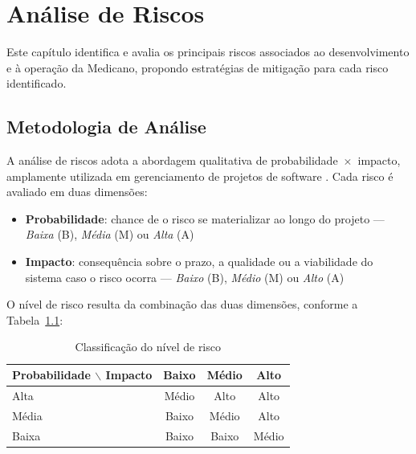 \chapter{Análise de Riscos}
\label{chap:risks}

Este capítulo identifica e avalia os principais riscos
associados ao desenvolvimento e à operação da Medicano,
propondo estratégias de mitigação para cada risco
identificado.

\section{Metodologia de Análise}
\label{sec:risk-methodology}

A análise de riscos adota a abordagem qualitativa de
probabilidade~$\times$~impacto, amplamente utilizada
em gerenciamento de projetos de software
\cite{sommerville2011}. Cada risco é avaliado em duas
dimensões:

\begin{itemize}
  \item \textbf{Probabilidade}: chance de o risco se
        materializar ao longo do projeto ---
        \textit{Baixa} (B), \textit{Média} (M) ou
        \textit{Alta} (A)
  \item \textbf{Impacto}: consequência sobre o prazo,
        a qualidade ou a viabilidade do sistema caso
        o risco ocorra ---
        \textit{Baixo} (B), \textit{Médio} (M) ou
        \textit{Alto} (A)
\end{itemize}

O nível de risco resulta da combinação das duas
dimensões, conforme a Tabela~\ref{tab:risk-levels}:

\begin{table}[H]
  \centering
  \caption{Classificação do nível de risco}
  \label{tab:risk-levels}
  \begin{tabular}{lccc}
    \toprule
    \textbf{Probabilidade} $\backslash$ \textbf{Impacto}
      & \textbf{Baixo}
      & \textbf{Médio}
      & \textbf{Alto} \\
    \midrule
    Alta
      & \cellcolor{warning!30} Médio
      & \cellcolor{danger!35} Alto
      & \cellcolor{danger!35} Alto \\
    Média
      & \cellcolor{success!25} Baixo
      & \cellcolor{warning!30} Médio
      & \cellcolor{danger!35} Alto \\
    Baixa
      & \cellcolor{success!25} Baixo
      & \cellcolor{success!25} Baixo
      & \cellcolor{warning!30} Médio \\
    \bottomrule
  \end{tabular}
\end{table}

